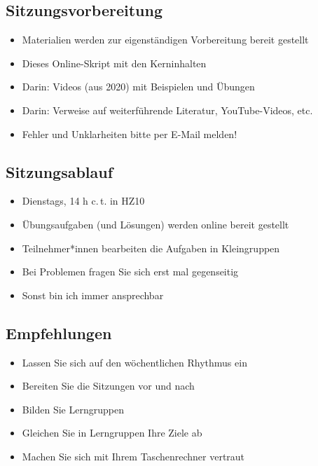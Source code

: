 \documentclass[
  11pt,
  ngerman,
  a4paper,
]{report}
\providecommand{\tightlist}{%
  \setlength{\itemsep}{0pt}\setlength{\parskip}{0pt}}
\begin{document}
\hypertarget{sitzungsvorbereitung}{%
\subsection*{Sitzungsvorbereitung}\label{sitzungsvorbereitung}}

\begin{itemize}
\tightlist
\item
  Materialien werden zur eigenständigen Vorbereitung bereit gestellt
\item
  Dieses Online-Skript mit den Kerninhalten
\item
  Darin: Videos (aus 2020) mit Beispielen und Übungen
\item
  Darin: Verweise auf weiterführende Literatur, YouTube-Videos, etc.
\item
  Fehler und Unklarheiten bitte per E-Mail melden!
\end{itemize}

\hypertarget{sitzungsablauf}{%
\subsection*{Sitzungsablauf}\label{sitzungsablauf}}

\begin{itemize}
\tightlist
\item
  Dienstags, 14 h c.\,t. in HZ10
\item
  Übungsaufgaben (und Lösungen) werden online bereit gestellt
\item
  Teilnehmer*innen bearbeiten die Aufgaben in Kleingruppen
\item
  Bei Problemen fragen Sie sich erst mal gegenseitig
\item
  Sonst bin ich immer ansprechbar
\end{itemize}

\hypertarget{empfehlungen}{%
\subsection*{Empfehlungen}\label{empfehlungen}}

\begin{itemize}
\tightlist
\item
  Lassen Sie sich auf den wöchentlichen Rhythmus ein
\item
  Bereiten Sie die Sitzungen vor und nach
\item
  Bilden Sie Lerngruppen
\item
  Gleichen Sie in Lerngruppen Ihre Ziele ab
\item
  Machen Sie sich mit Ihrem Taschenrechner vertraut
\end{itemize}
\end{document}
